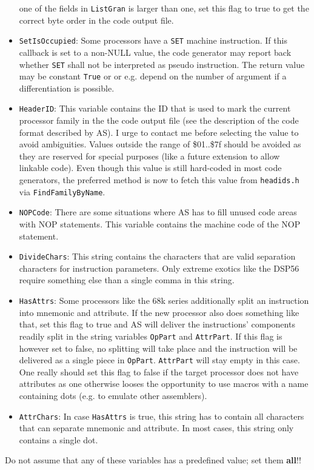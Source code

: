 \documentclass[12pt,twoside]{report}
\newcommand{\bb}[1]{{\bf #1}}
\newcommand{\tty}[1]{{\tt #1}}
\begin{document}
\begin{itemize}
{      one of the fields in \tty{ListGran} is larger than one, set this flag
      to true to get the correct byte order in the code output file.}
\item{\tty{SetIsOccupied}: Some processors have a \tty{SET} machine instruction.
      If this callback is set to a non-NULL value, the code generator
      may report back whether \tty{SET} shall not be interpreted as
      pseudo instruction.  The return value may be constant \tty{True} or
      or e.g. depend on the number of argument if a differentiation is
      possible.}
\item{\tty{HeaderID}: This variable contains the ID that is used to mark the
      current processor family in the the code output file (see the
      description of the code format described by AS).  I urge to
      contact me before selecting the value to avoid ambiguities.
      Values outside the range of \$01..\$7f should be avoided as they
      are reserved for special purposes (like a future extension to
      allow linkable code). Even though this value is still hard-coded
      in most code generators, the preferred method is now to fetch this
      value from {\tt headids.h} via {\tt FindFamilyByName}.}
\item{\tty{NOPCode}: There are some situations where AS has to fill unused
      code areas with NOP statements.  This variable contains the
      machine code of the NOP statement.}
\item{\tty{DivideChars}: This string contains the characters that are valid
      separation characters for instruction parameters.  Only extreme
      exotics like the DSP56 require something else than a single comma
      in this string.}
\item{\tty{HasAttrs}: Some processors like the 68k series additionally split
      an instruction into mnemonic and attribute.  If the new processor
      also does something like that, set this flag to true and AS will
      deliver the instructions' components readily split in the string
      variables \tty{OpPart} and \tty{AttrPart}.  If this flag is however set to
      false, no splitting will take place and the instruction will be
      delivered as a single piece in \tty{OpPart}.  \tty{AttrPart} will stay empty
      in this case.  One really should set this flag to false if the
      target processor does not have attributes as one otherwise looses
      the opportunity to use macros with a name containing dots (e.g.
      to emulate other assemblers).}
\item{\tty{AttrChars}: In case \tty{HasAttrs} is true, this string has to contain
      all characters that can separate mnemonic and attribute.  In most
      cases, this string only contains a single dot.}
\end{itemize}
Do not assume that any of these variables has a predefined value; set
them \bb{all}!!
\end{document}
